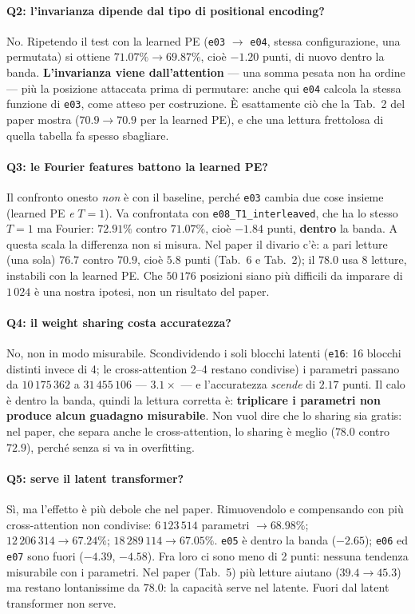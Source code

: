 \documentclass[
  11pt,
]{article}
\begin{document}
\paragraph{Q2: l'invarianza dipende dal tipo di positional encoding?}
No. Ripetendo il test con la learned PE (\texttt{e03} $\to$ \texttt{e04}, stessa configurazione, una permutata) si ottiene $71.07\% \to 69.87\%$, cioè $-1.20$ punti, di nuovo dentro la banda. \textbf{L'invarianza viene dall'attention} --- una somma pesata non ha ordine --- più la posizione attaccata prima di permutare: anche qui \texttt{e04} calcola la stessa funzione di \texttt{e03}, come atteso per costruzione. È esattamente ciò che la Tab.~2 del paper mostra ($70.9 \to 70.9$ per la learned PE), e che una lettura frettolosa di quella tabella fa spesso sbagliare.

\paragraph{Q3: le Fourier features battono la learned PE?}
Il confronto onesto \emph{non} è con il baseline, perché \texttt{e03} cambia due cose insieme (learned PE \emph{e} $T{=}1$). Va confrontata con \texttt{e08\_T1\_interleaved}, che ha lo stesso $T{=}1$ ma Fourier: $72.91\%$ contro $71.07\%$, cioè $-1.84$ punti, \textbf{dentro} la banda. A questa scala la differenza non si misura. Nel paper il divario c'è: a pari letture (una sola) $76.7$ contro $70.9$, cioè $5.8$ punti (Tab.~6 e Tab.~2); il $78.0$ usa 8 letture, instabili con la learned PE. Che $50\,176$ posizioni siano più difficili da imparare di $1\,024$ è una nostra ipotesi, non un risultato del paper.

\paragraph{Q4: il weight sharing costa accuratezza?}
No, non in modo misurabile. Scondividendo i soli blocchi latenti (\texttt{e16}: 16 blocchi distinti invece di 4; le cross-attention 2--4 restano condivise) i parametri passano da $10\,175\,362$ a $31\,455\,106$ --- $3.1\times$ --- e l'accuratezza \emph{scende} di $2.17$ punti. Il calo è dentro la banda, quindi la lettura corretta è: \textbf{triplicare i parametri non produce alcun guadagno misurabile}. Non vuol dire che lo sharing sia gratis: nel paper, che separa anche le cross-attention, lo sharing è meglio ($78.0$ contro $72.9$), perché senza si va in overfitting.

\paragraph{Q5: serve il latent transformer?}
Sì, ma l'effetto è più debole che nel paper. Rimuovendolo e compensando con più cross-attention non condivise: $6\,123\,514$ parametri $\to 68.98\%$; $12\,206\,314 \to 67.24\%$; $18\,289\,114 \to 67.05\%$. \texttt{e05} è dentro la banda ($-2.65$); \texttt{e06} ed \texttt{e07} sono fuori ($-4.39$, $-4.58$). Fra loro ci sono meno di 2 punti: nessuna tendenza misurabile con i parametri. Nel paper (Tab.~5) più letture aiutano ($39.4 \to 45.3$) ma restano lontanissime da $78.0$: la capacità serve nel latente. Fuori dal latent transformer non serve.
\end{document}
